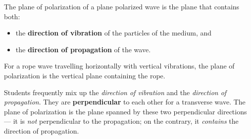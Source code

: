\documentclass[11pt]{article}
\newcommand{\cle}[1]{{\popxbold\color{popdark}#1}}
\begin{document}
\begin{definition}
The \cle{plane of polarization} of a plane polarized wave is the plane that contains both:
\begin{itemize}
\item the \textbf{direction of vibration} of the particles of the medium, and
\item the \textbf{direction of propagation} of the wave.
\end{itemize}
For a rope wave travelling horizontally with vertical vibrations, the plane of polarization is the vertical plane containing the rope.
\end{definition}

\begin{attention}
Students frequently mix up the \emph{direction of vibration} and the \emph{direction of propagation}. They are \textbf{perpendicular} to each other for a transverse wave. The plane of polarization is the plane spanned by these two perpendicular directions --- it is \emph{not} perpendicular to the propagation; on the contrary, it \emph{contains} the direction of propagation.
\end{attention}
\end{document}
